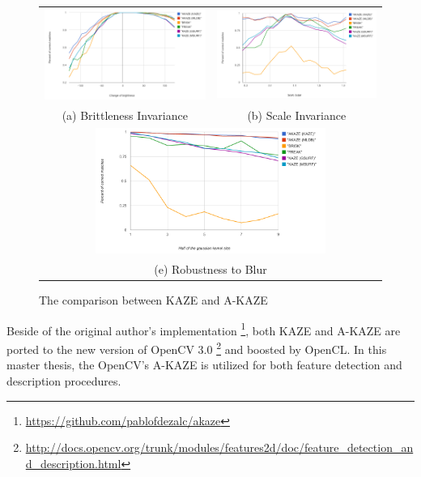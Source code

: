 \begin{figure}[H]
\begin{tabular}{cc}
  \includegraphics[width=75mm]{figures/brithness_akaze} &  \includegraphics[width=75mm]{figures/scale_akaze} \\
(a) Brittleness Invariance & (b) Scale Invariance \\[6pt]
\multicolumn{2}{c}{\includegraphics[width=75mm]{figures/blur_akaze} }\\
\multicolumn{2}{c}{(e) Robustness to Blur}
\end{tabular}
\caption{The comparison between KAZE and A-KAZE}\label{fig:compare_kaze_and_A-kaze}
\end{figure}

Beside of the original author's implementation \footnote{\url{https://github.com/pablofdezalc/akaze}}, both KAZE and A-KAZE are ported to the new version of OpenCV 3.0  \footnote{\url{http://docs.opencv.org/trunk/modules/features2d/doc/feature_detection_and_description.html}} and boosted by OpenCL. In this master thesis, the OpenCV's A-KAZE is utilized for both feature detection and description procedures. 

